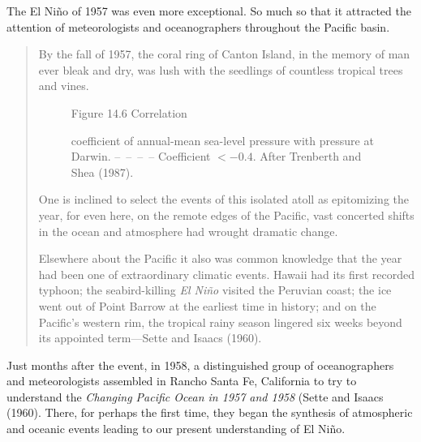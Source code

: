 The El Ni\~{n}o of 1957 was even more exceptional. So much so that it
attracted the attention of meteorologists and oceanographers
throughout the Pacific basin.
\begin{quotation} \small
By the fall of 1957, the coral ring of Canton Island, in the memory of
man ever bleak and dry, was lush with the seedlings of countless
tropical trees and vines.

\begin{figure}[b!]
\vspace{-1ex}
\centering
{}
\footnotesize
Figure 14.6 Correlation \rule{0pt}{3ex}coefficient of annual-mean
sea-level pressure with pressure at Darwin. --\ --\ --\ -- Coefficient
$< -0.4$. After Trenberth and Shea (1987).

\label{fig:ensocorrelations}
\end{figure}
One is inclined to select the events of this isolated atoll as
epitomizing the year, for even here, on the remote edges of the
Pacific, vast concerted shifts in the ocean and atmosphere had wrought
dramatic change.

Elsewhere about the Pacific it also was common knowledge that the year
had been one of extraordinary climatic events. Hawaii had its first
recorded typhoon; the seabird-killing \textit{El Ni\~{n}o} visited the
Peruvian coast; the ice went out of Point Barrow at the earliest time
in history; and on the Pacific's western rim, the tropical rainy
season lingered six weeks beyond its appointed term---Sette and Isaacs
(1960).
\end{quotation}

Just months after the event, in 1958, a distinguished group of
oceanographers and meteorologists assembled in Rancho Santa Fe,
California to try to understand the \textit{Changing Pacific Ocean in
  1957 and 1958} (Sette and Isaacs (1960). There, for perhaps the
first time, they began the synthesis of atmospheric and oceanic events
leading to our present understanding of El Ni\~{n}o.

